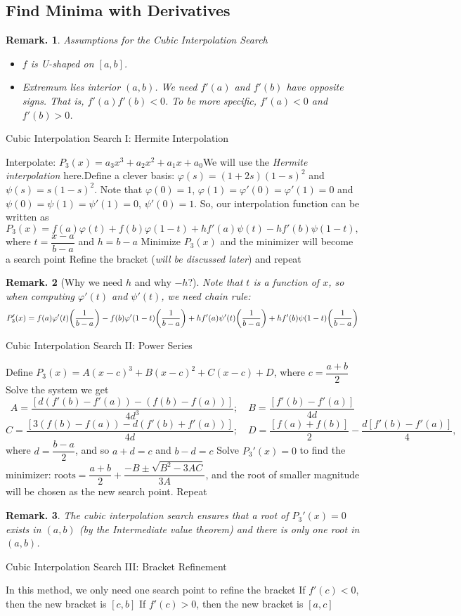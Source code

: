 \documentclass[12pt, a4paper]{article}
\newtheorem{rmk}{Remark.}[section]
\def\phi{\varphi}
\begin{document}
\subsection{Find Minima with Derivatives}
\begin{rmk} Assumptions for the Cubic Interpolation Search
\begin{itemize}
	\item $f$ is U-shaped on $[a,b]$.
	\item Extremum lies interior $(a,b)$. We need $f'(a)$ and $f'(b)$ have opposite signs. That is, $f'(a)f'(b)<0$. To be more specific, $f'(a)<0$ and $f'(b)>0$.
\end{itemize}	
\end{rmk}
\begin{algorithm}
	\caption{Cubic Interpolation Search I: Hermite Interpolation}
	Interpolate: $P_3(x)=a_3x^3+a_2x^2+a_1x+a_0$\newline We will use the \textit{Hermite interpolation} here.\newline Define a clever basis: $\phi(s)=(1+2s)(1-s)^2$ and $\psi(s)=s(1-s)^2$. Note that $\phi(0)=1$, $\phi(1)=\phi'(0)=\phi'(1)=0$ and $\psi(0)=\psi(1)=\psi'(1)=0$, $\psi'(0)=1$. So, our interpolation function can be written as \[P_3(x)=f(a)\phi(t)+f(b)\phi(1-t)+hf'(a)\psi(t)-hf'(b)\psi(1-t),\] where $t=\dfrac{x-a}{b-a}$ and $h=b-a$\;
	Minimize $P_3(x)$ and the minimizer will become a search point\;
	Refine the bracket (\textit{will be discussed later}) and repeat\;
\end{algorithm}
\begin{rmk}[Why we need $h$ and why $-h$?]
	Note that $t$ is a function of $x$, so when computing $\phi'(t)$ and $\psi'(t)$, we need chain rule: \[P_3'(x)=f(a)\phi'(t)\qty(\dfrac{1}{b-a})-f(b)\phi'(1-t)\qty(\dfrac{1}{b-a})+hf'(a)\psi'(t)\qty(\dfrac{1}{b-a})+hf'(b)\psi(1-t)\qty(\dfrac{1}{b-a})\]	
\end{rmk}
\begin{algorithm}
	\caption{Cubic Interpolation Search II: Power Series}
	Define $P_3(x)=A(x-c)^3+B(x-c)^2+C(x-c)+D$, where $c=\dfrac{a+b}{2}$\;
	Solve the system we get \[A=\dfrac{[d(f'(b)-f'(a))-(f(b)-f(a))]}{4d^3};\quad B=\dfrac{[f'(b)-f'(a)]}{4d}\]\[C=\dfrac{[3(f(b)-f(a))-d(f'(b)+f'(a))]}{4d};\quad D=\dfrac{[f(a)+f(b)]}{2}-\dfrac{d[f'(b)-f'(a)]}{4},\] where $d=\dfrac{b-a}{2}$, and so $a+d=c$ and $b-d=c$\;
	Solve $P_3'(x)=0$ to find the minimizer: $\text{roots}=\dfrac{a+b}{2}+\dfrac{-B\pm\sqrt{B^2-3AC}}{3A}$, and the root of smaller magnitude will be chosen as the new search point. Repeat\;
\end{algorithm}
\begin{rmk}
	The cubic interpolation search ensures that a root of $P_3'(x)=0$ exists in $(a,b)$ (by the Intermediate value theorem) and there is only one root in $(a,b)$. 
\end{rmk}
\begin{algorithm}
	\caption{Cubic Interpolation Search III: Bracket Refinement}
	In this method, we only need one search point to refine the bracket\;
	If $f'(c)<0$, then the new bracket is $[c,b]$\;
	If $f'(c)>0$, then the new bracket is $[a,c]$\;	
\end{algorithm}
\end{document}

